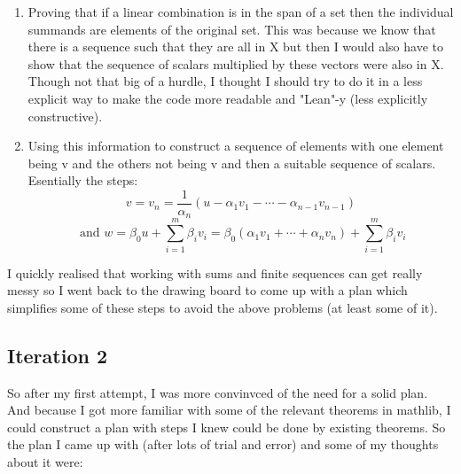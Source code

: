 \documentclass{article}
\begin{document}
\begin{enumerate}
    \item Proving that if a linear combination is in the span of a set then the individual summands are elements of the original set. This was because we know that there is a sequence such that they are all in X but then I would also have to show that the sequence of scalars multiplied by these vectors were also in X. Though not that big of a hurdle, I thought I should try to do it in a less explicit way to make the code more readable and "Lean"-y (less explicitly constructive).
    \item Using this information to construct a sequence of elements with one element being v and the others not being v and then a suitable sequence of scalars. Esentially the steps:
    \[
        v = v_n = \frac{1}{\alpha_n} \left(u - \alpha_1 v_1 - \cdots - \alpha_{n-1} v_{n-1}\right)
    \]
    \[    
        \text{ and } w = \beta_0 u + \sum_{i=1}^m \beta_i v_i  = \beta_0 (\alpha_1 v_1 + \cdots + \alpha_n v_n) + \sum_{i=1}^m \beta_i v_i
    \]
\end{enumerate}
I quickly realised that working with sums and finite sequences can get really messy so I went back to the drawing board to come up with a plan which simplifies some of these steps to avoid the above problems (at least some of it).

\subsection{Iteration 2}

So after my first attempt, I was more convinvced of the need for a solid plan. And because I got more familiar with some of the relevant theorems in mathlib, I could construct a plan with steps I knew could be done by existing theorems. So the plan I came up with (after lots of trial and error) and some of my thoughts about it were: 
\end{document}
